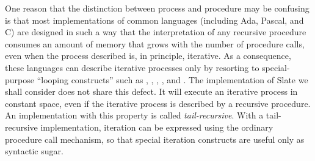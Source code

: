 One reason that the distinction between process and procedure may be confusing is that most implementations of common languages (including Ada, Pascal, and C) are designed in such a way that the interpretation of any recursive procedure consumes an amount of memory that grows with the number of procedure calls, even when the process described is, in principle, iterative. As a consequence, these languages can describe iterative processes only by resorting to special-purpose ``looping constructs'' such as , , , , and . The implementation of Slate we shall consider does not share this defect. It will execute an iterative process in constant space, even if the iterative process is described by a recursive procedure. An implementation with this property is called \textit{tail-recursive}. With a tail-recursive implementation, iteration can be expressed using the ordinary procedure call mechanism, so that special iteration constructs are useful only as syntactic sugar.

